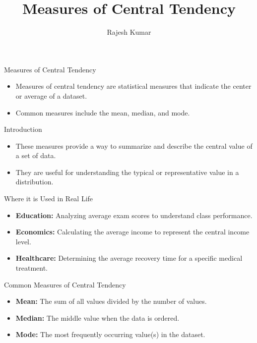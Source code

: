 
\title{Measures of Central Tendency}
\author{Rajesh Kumar}
\date{}

\begin{frame}
  \titlepage
\end{frame}

\begin{frame}{Measures of Central Tendency}
  \begin{itemize}
    \item Measures of central tendency are statistical measures that indicate the center or average of a dataset.
    \item Common measures include the mean, median, and mode.
  \end{itemize}
\end{frame}

\begin{frame}{Introduction}
  \begin{itemize}
    \item These measures provide a way to summarize and describe the central value of a set of data.
    \item They are useful for understanding the typical or representative value in a distribution.
  \end{itemize}
\end{frame}

\begin{frame}{Where it is Used in Real Life}
  \begin{itemize}
    \item \textbf{Education:} Analyzing average exam scores to understand class performance.
    \item \textbf{Economics:} Calculating the average income to represent the central income level.
    \item \textbf{Healthcare:} Determining the average recovery time for a specific medical treatment.
  \end{itemize}
\end{frame}

\begin{frame}{Common Measures of Central Tendency}
  \begin{itemize}
    \item \textbf{Mean:} The sum of all values divided by the number of values.
    \item \textbf{Median:} The middle value when the data is ordered.
    \item \textbf{Mode:} The most frequently occurring value(s) in the dataset.
  \end{itemize}
\end{frame}


